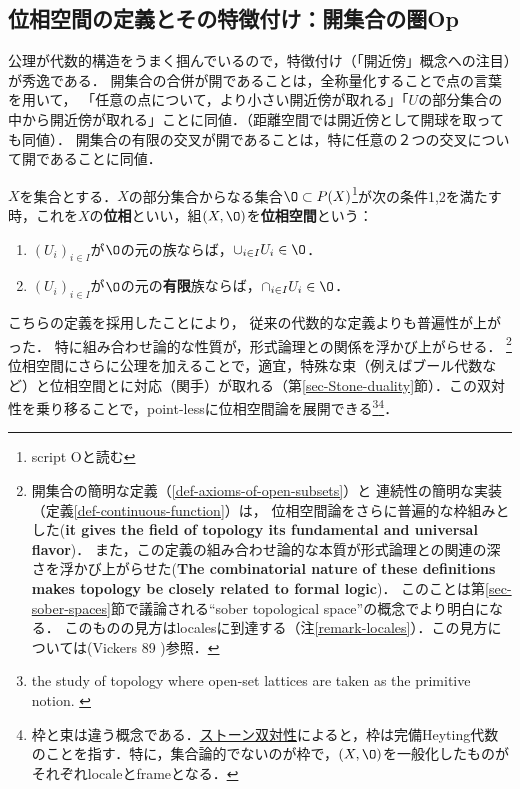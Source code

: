 \documentclass[uplatex,dvipdfmx]{jsreport}
\begin{document}
\subsection{位相空間の定義とその特徴付け：開集合の圏Op}

\begin{tcolorbox}[colframe=ForestGreen, colback=ForestGreen!10!white, breakable]
    公理が代数的構造をうまく掴んでいるので，特徴付け（「開近傍」概念への注目）が秀逸である．
    開集合の合併が開であることは，全称量化することで点の言葉を用いて，
    「任意の点について，より小さい開近傍が取れる」「$U$の部分集合の中から開近傍が取れる」ことに同値．（距離空間では開近傍として開球を取っても同値）．
    開集合の有限の交叉が開であることは，特に任意の２つの交叉について開であることに同値．
\end{tcolorbox}

\begin{definition}\label{def-axioms-of-open-subsets}
    $X$を集合とする．$X$の部分集合からなる集合$\O\subset P(X)$\footnote{script Oと読む}が次の条件1,2を満たす時，これを$X$の\textbf{位相}といい，組$(X,\O)$を\textbf{位相空間}という：
    \begin{enumerate}
        \item $(U_i)_{i\in I}$が$\O$の元の族ならば，$\cup_{i\in I}U_i\in\O$．
        \item $(U_i)_{i\in I}$が$\O$の元の\textbf{有限}族ならば，$\cap_{i\in I}U_i\in\O$．
    \end{enumerate}
\end{definition}
\begin{remark}
    こちらの定義を採用したことにより，
    従来の代数的な定義よりも普遍性が上がった．
    特に組み合わせ論的な性質が，形式論理との関係を浮かび上がらせる．
    \footnote{開集合の簡明な定義（\ref{def-axioms-of-open-subsets}）と
    連続性の簡明な実装（定義\ref{def-continuous-function}）は，
    位相空間論をさらに普遍的な枠組みとした(\textbf{it gives the field of topology its fundamental and universal flavor})．
    また，この定義の組み合わせ論的な本質が形式論理との関連の深さを浮かび上がらせた(\textbf{The combinatorial nature of these definitions makes topology be closely related to formal logic})．
    このことは第\ref{sec-sober-spaces}節で議論される“sober topological space”の概念でより明白になる．
    このものの見方はlocalesに到達する（注\ref{remark-locales}）．この見方については(Vickers 89 \cite{Vickers})参照．\cite{nLab}}
    位相空間にさらに公理を加えることで，適宜，特殊な束（例えばブール代数など）と位相空間とに対応（関手）が取れる（第\ref{sec-Stone-duality}節）．この双対性を乗り移ることで，point-lessに位相空間論を展開できる\footnote{the study of topology where open-set lattices are taken as the primitive notion. \cite{Johnstone}}\footnote{枠と束は違う概念である．\href{https://ja.wikipedia.org/wiki/ストーン双対性}{ストーン双対性}によると，枠は完備Heyting代数のことを指す．特に，集合論的でないのが枠で，$(X,\O)$を一般化したものがそれぞれlocaleとframeとなる．}．
\end{remark}
\end{document}
